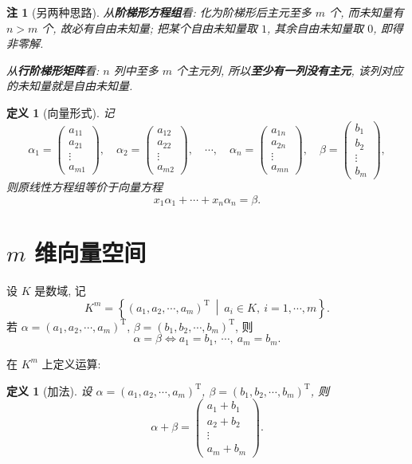 \documentclass[UTF8,11pt]{ctexart}
\theoremstyle{cnthm}
\newtheorem{defn}[thm]{定义}
\newtheorem{rem}[thm]{注}
\begin{document}
\begin{rem}[另两种思路]
从\textbf{阶梯形方程组}看: 化为阶梯形后主元至多 $m$ 个, 而未知量有 $n>m$ 个, 故必有自由未知量; 把某个自由未知量取 $1$, 其余自由未知量取 $0$, 即得非零解.

从\textbf{行阶梯形矩阵}看: $n$ 列中至多 $m$ 个主元列, 所以\textbf{至少有一列没有主元}, 该列对应的未知量就是自由未知量.
\end{rem}

\begin{defn}[向量形式]
记
\[
\alpha_1=\begin{pmatrix}a_{11}\\a_{21}\\\vdots\\a_{m1}\end{pmatrix},\quad
\alpha_2=\begin{pmatrix}a_{12}\\a_{22}\\\vdots\\a_{m2}\end{pmatrix},\quad
\cdots,\quad
\alpha_n=\begin{pmatrix}a_{1n}\\a_{2n}\\\vdots\\a_{mn}\end{pmatrix},\quad
\beta=\begin{pmatrix}b_1\\b_2\\\vdots\\b_m\end{pmatrix},
\]
则原线性方程组等价于向量方程
\[
x_1\alpha_1+\cdots+x_n\alpha_n=\beta .
\]
\end{defn}

\section{$m$ 维向量空间}

设 $K$ 是数域, 记
\[
K^m=\left\{(a_1,a_2,\cdots,a_m)^{\mathrm T}\ \middle|\ a_i\in K,\ i=1,\cdots,m\right\}.
\]
若 $\alpha=(a_1,a_2,\cdots,a_m)^{\mathrm T}$, $\beta=(b_1,b_2,\cdots,b_m)^{\mathrm T}$, 则
\[
\alpha=\beta\iff a_1=b_1,\ \cdots,\ a_m=b_m .
\]

在 $K^m$ 上定义运算:

\begin{defn}[加法]
设 $\alpha=(a_1,a_2,\cdots,a_m)^{\mathrm T}$, $\beta=(b_1,b_2,\cdots,b_m)^{\mathrm T}$, 则
\[
\alpha+\beta=\begin{pmatrix}a_1+b_1\\a_2+b_2\\\vdots\\a_m+b_m\end{pmatrix}.
\]
\end{defn}
\end{document}
